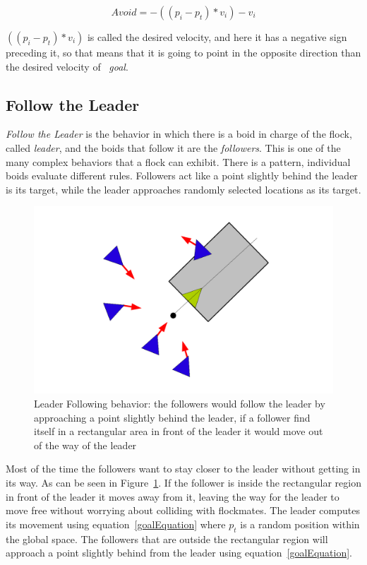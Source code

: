 \begin{equation}
\label{avoidEquation}
Avoid = -((p_i - p_t) * v_i) - v_i
\end{equation}

$((p_i - p_t) * v_i)$ is called the desired velocity, and here it has a negative sign preceding it, so that means that it is going to point in the opposite direction than the desired velocity of ~\textit{goal}.

\subsection{Follow the Leader}
\textit{Follow the Leader} is the behavior in which there is a boid in charge of the flock, called \textit{leader}, and the boids that follow it are the \textit{followers}. This is one of the many complex behaviors that a flock can exhibit. There is a pattern, individual boids evaluate different rules. Followers act like a point slightly behind the leader is its target, while the leader approaches randomly selected locations as its target.

\begin{figure}[htbp]
\begin{center}
\includegraphics[scale=0.5]{figures/leaderFollowing.pdf}
\caption{Leader Following behavior: the followers would follow the leader by approaching a point slightly behind the leader, if a follower find itself in a rectangular area in front of the leader it would move out of the way of the leader}
\label{leaderPDF}
\end{center}
\end{figure}

Most of the time the followers want to stay closer to the leader without getting in its way. As can be seen in Figure~\ref{leaderPDF}.  If the follower is inside the rectangular region in front of the leader it moves away from it, leaving the way for the leader to move free without worrying about colliding with flockmates. The leader computes its movement using equation~\ref{goalEquation} where $p_t$ is a random position within the global space. The followers that are outside the rectangular region will approach a point slightly behind from the leader using equation~\ref{goalEquation}.

